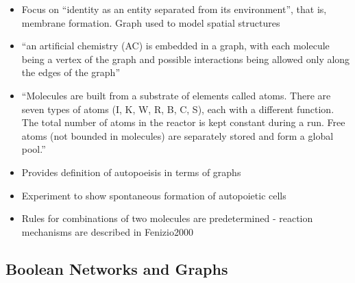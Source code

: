 		\begin{itemize}
			
			\item
			
			Focus on ``identity as an entity separated from its environment'',
			that is, membrane formation. Graph used to model spatial structures
			
			\item
			
			``an artificial chemistry (AC) is embedded in a graph, with each
			molecule being a vertex of the graph and possible interactions being
			allowed only along the edges of the graph''
			
			\item
			
			``Molecules are built from a substrate of elements called atoms. There
			are seven types of atoms (I, K, W, R, B, C, S), each with a different
			function. The total number of atoms in the reactor is kept constant
			during a run. Free atoms (not bounded in molecules) are separately
			stored and form a global pool.''
			
			\item
			
			Provides definition of autopoeisis in terms of graphs
			
			\item
			
			Experiment to show spontaneous formation of autopoietic cells
			
			\item
			
			Rules for combinations of two molecules are predetermined - reaction
			mechanisms are described in Fenizio2000
			
		\end{itemize}
		

\subsection{Boolean Networks and Graphs}

